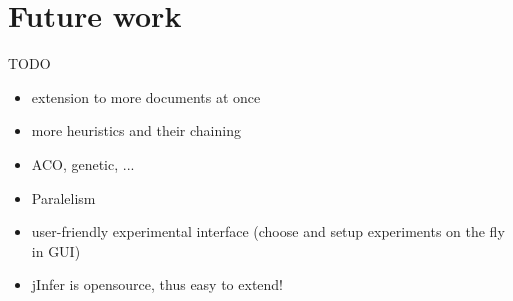 \chapter{Future work}

TODO

\begin{itemize}
  \item extension to more documents at once
  \item more heuristics and their chaining
  \item ACO, genetic, ...
  \item Paralelism
  \item user-friendly experimental interface (choose and setup experiments on the fly in GUI)
  \item jInfer is opensource, thus easy to extend!
\end{itemize}
